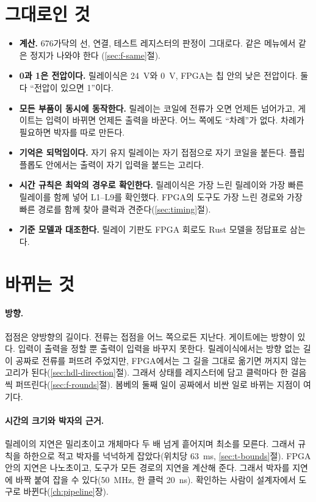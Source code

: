 \section{그대로인 것}\label{sec:rf-same}

\begin{itemize}
\item \textbf{계산.} 676가닥의 선, 연결, 테스트 레지스터의 판정이 그대로다. 같은 메뉴에서 같은 정지가 나와야 한다
(\ref{sec:f-same}절).
\item \textbf{0과 1은 전압이다.} 릴레이식은 24~V와 0~V, FPGA는 칩 안의 낮은 전압이다. 둘 다 ``전압이 있으면 1''이다.
\item \textbf{모든 부품이 동시에 동작한다.} 릴레이는 코일에 전류가 오면 언제든 넘어가고, 게이트는 입력이 바뀌면 언제든
출력을 바꾼다. 어느 쪽에도 ``차례''가 없다. 차례가 필요하면 박자를 따로 만든다.
\item \textbf{기억은 되먹임이다.} 자기 유지 릴레이는 자기 접점으로 자기 코일을 붙든다. 플립플롭도 안에서는 출력이
자기 입력을 붙드는 고리다.
\item \textbf{시간 규칙은 최악의 경우로 확인한다.} 릴레이식은 가장 느린 릴레이와 가장 빠른 릴레이를 함께 넣어 L1--L9를
확인했다. FPGA의 도구도 가장 느린 경로와 가장 빠른 경로를 함께 찾아 클럭과 견준다(\ref{sec:timing}절).
\item \textbf{기준 모델과 대조한다.} 릴레이 기판도 FPGA 회로도 Rust 모델을 정답표로 삼는다.
\end{itemize}

\section{바뀌는 것}\label{sec:rf-diff}

\paragraph{방향.} 접점은 양방향의 길이다. 전류는 접점을 어느 쪽으로든 지난다. 게이트에는 방향이 있다. 입력이 출력을
정할 뿐 출력이 입력을 바꾸지 못한다. 릴레이식에서는 방향 없는 길이 공짜로 전류를 퍼뜨려 주었지만, FPGA에서는 그
길을 그대로 옮기면 꺼지지 않는 고리가 된다(\ref{sec:hdl-direction}절). 그래서 상태를 레지스터에 담고 클럭마다 한
걸음씩 퍼뜨린다(\ref{sec:f-rounds}절).
봄베의 둘째 일이 공짜에서 비싼 일로 바뀌는 지점이 여기다.

\paragraph{시간의 크기와 박자의 근거.} 릴레이의 지연은 밀리초이고 개체마다 두 배 넘게 흩어지며 최소를 모른다.
그래서 규칙을 하한으로 적고 박자를 넉넉하게 잡았다(위치당 63~ms, \ref{sec:t-bounds}절). FPGA 안의 지연은 나노초이고,
도구가 모든 경로의 지연을 계산해 준다. 그래서 박자를 지연에 바짝 붙여 잡을 수 있다(50~MHz, 한 클럭 20~ns).
확인하는 사람이 설계자에서 도구로 바뀐다(\ref{ch:pipeline}장).

